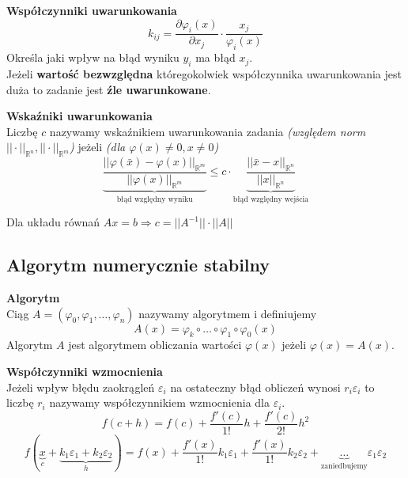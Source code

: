 \documentclass[../mn-notatki.tex]{subfiles}
\begin{document}
\begin{tcolorbox}
\textbf{Współczynniki uwarunkowania}\\
\[
k_{ij} = \frac{\partial \varphi_i(x)}{\partial x_j} \cdot \frac{x_j}{\varphi_i(x)}
\]
    Określa jaki wpływ na błąd wyniku $y_i$ ma błąd $x_j$.\\
     Jeżeli \textbf{wartość bezwzględna} któregokolwiek współczynnika
uwarunkowania jest duża to zadanie jest \textbf{źle uwarunkowane}.

\end{tcolorbox}

\begin{tcolorbox}
\textbf{Wskaźniki uwarunkowania}\\
Liczbę $c$ nazywamy wskaźnikiem uwarunkowania zadania
\textit{(względem norm $||\cdot||_{\mathbb{R}^n}, ||\cdot||_{\mathbb{R}^m}$)}
jeżeli \textit{(dla $\varphi(x) \neq 0, x \neq 0$)}
\[
\underbrace{\frac{||\varphi(\bar{x}) - \varphi(x)||_{\mathbb{R}^m}}{||\varphi(x)||_{\mathbb{R}^m}}}_{\text{błąd względny wyniku}}
\leqslant
c  \cdot
\underbrace{\frac{||\bar{x} - x||_{\mathbb{R}^n}}{||x||_{\mathbb{R}^n}}}_{\text{błąd względny wejścia}}
\]

Dla układu równań
$Ax = b \Rightarrow
c = || A^{-1}|| \cdot ||A||$
\end{tcolorbox}

\subsection{Algorytm numerycznie stabilny}

\begin{tcolorbox}
\textbf{Algorytm}\\
Ciąg $A = (\varphi_0, \varphi_1, \ldots, \varphi_n)$ nazywamy algorytmem i definiujemy
\[
A(x) = \varphi_k \circ \ldots \circ \varphi_1 \circ \varphi_0(x)
\]
Algorytm $A$ jest algorytmem obliczania wartości $\varphi(x)$ jeżeli
$\varphi(x) = A(x)$.
\end{tcolorbox}

\begin{tcolorbox}
\textbf{Współczynniki wzmocnienia}\\
Jeżeli wpływ błędu zaokrągleń $\varepsilon_i$ na ostateczny błąd obliczeń
wynosi $r_i \varepsilon_i$ to liczbę $r_i$ nazywamy współczynnikiem wzmocnienia
dla $\varepsilon_i$.
\[
f(c + h) =
f(c) +
\frac{f'(c)}{1!} h +
\frac{f'(c)}{2!} h^2
\]
\[
f(\underbrace{x}_{c} + \underbrace{k_1 \varepsilon_1 + k_2 \varepsilon_2}_h) =
f(x) +
\frac{f'(x)}{1!} k_1 \varepsilon_1 +
\frac{f'(x)}{1!} k_2 \varepsilon_2 +
\underbrace{\ldots}_{\text{zaniedbujemy}} \varepsilon_1 \varepsilon_2
\]
\end{tcolorbox}
\end{document}

